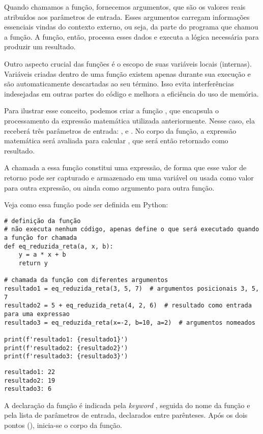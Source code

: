 Quando chamamos a função, fornecemos argumentos, que são os valores reais atribuídos aos parâmetros de entrada.
Esses argumentos carregam informações essenciais vindas do contexto externo, ou seja, da parte do programa que chamou
a função.
A função, então, processa esses dados e executa a lógica necessária para produzir um resultado.

Outro aspecto crucial das funções é o escopo de suas variáveis locais (internas).
Variáveis criadas dentro de uma função existem apenas durante sua execução e são automaticamente descartadas ao seu
término.
Isso evita interferências indesejadas em outras partes do código e melhora a eficiência do uso de memória.

Para ilustrar esse conceito, podemos criar a função , que encapsula o processamento da
expressão matemática utilizada anteriormente.
Nesse caso, ela receberá três parâmetros de entrada: ,  e .
No corpo da função, a expressão matemática será avaliada para calcular ,
que será então retornado como resultado.

A chamada a essa função constitui uma expressão, de forma que esse valor de retorno pode ser capturado e armazenado
em uma variável ou usada como valor para outra expressão, ou ainda como argumento para outra função.

Veja como essa função pode ser definida em Python:
\begin{verbatim}
# definição da função
# não executa nenhum código, apenas define o que será executado quando a função for chamada
def eq_reduzida_reta(a, x, b):
    y = a * x + b
    return y

# chamada da função com diferentes argumentos
resultado1 = eq_reduzida_reta(3, 5, 7)  # argumentos posicionais 3, 5, 7
resultado2 = 5 + eq_reduzida_reta(4, 2, 6)  # resultado como entrada para uma expressao
resultado3 = eq_reduzida_reta(x=-2, b=10, a=2)  # argumentos nomeados

print(f'resultado1: {resultado1}')
print(f'resultado2: {resultado2}')
print(f'resultado3: {resultado3}')
\end{verbatim}
\begin{verbatim}
resultado1: 22
resultado2: 19
resultado3: 6
\end{verbatim}

A declaração da função é indicada pela \emph{keyword} , seguida do nome da função e pela lista de
parâmetros de entrada, declarados entre parênteses.
Após os dois pontos (\inlcode{:}), inicia-se o corpo da função.


